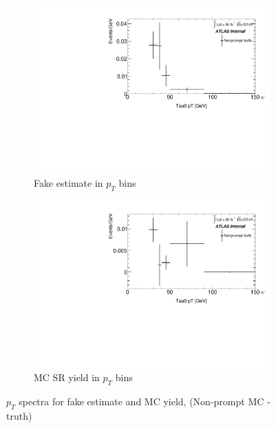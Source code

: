 \documentclass[11pt]{article}
\begin{document}
	\begin{figure}[H]
	\centering
	\begin{subfigure}{.5\textwidth}
	\centering
	\includegraphics[width=0.95\linewidth]{figures/FakesEstimate_data_pp8_nonallhad_new_scaledHists/hist_FakeEstimate_Nonprompt-truth.pdf}
  	\caption{Fake estimate in $p_T$ bins}
  	\label{fig:sub1}
	\end{subfigure}%
	\begin{subfigure}{.5\textwidth}
	\centering
	\includegraphics[width=0.95\linewidth]{figures/FakesEstimate_data_pp8_nonallhad_new_scaledHists/hist_SRMC_Nonprompt-truth.pdf}
	\caption{MC SR yield in $p_T$ bins}
	\end{subfigure}
	\caption{$p_T$ spectra for fake estimate and MC yield, (Non-prompt MC - truth)}
	\end{figure}
\end{document}
